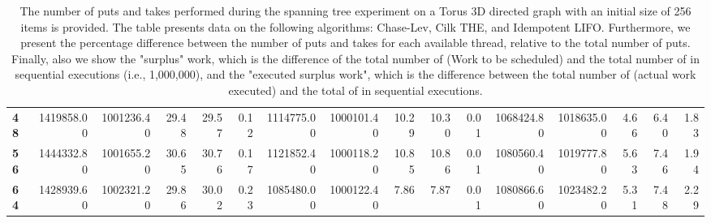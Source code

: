 \begin{table}[!ht]
{\begin{tabular}{lrrrrrrrrrrrrrrr}
\textbf{48} & 1419858.00 & 1001236.40 &          29.48 &       29.57 &                 0.12 & 1114775.00 & 1000101.40 &          10.29 &       10.30 &                 0.01 &      1068424.80 & 1018635.00 &           4.66 &        6.40 &                 1.83 \\
\textbf{56} & 1444332.80 & 1001655.20 &          30.65 &       30.76 &                 0.17 & 1121852.40 & 1000118.20 &          10.85 &       10.86 &                 0.01 &      1080560.40 & 1019777.80 &           5.63 &        7.46 &                 1.94 \\
\textbf{64} & 1428939.60 & 1002321.20 &          29.86 &       30.02 &                 0.23 & 1085480.00 & 1000122.40 &           7.86 &        7.87 &                 0.01 &      1080866.60 & 1023482.20 &           5.31 &        7.48 &                 2.29 \\
\bottomrule
\end{tabular}}
\label{difference-Torus_3D_directed-256-CHASELEV-CILK-IDEMPOTENT_LIFO}
\caption{The number of puts and takes performed during the
    spanning tree experiment on a Torus 3D directed graph with an initial size
    of 256 items is provided. The table presents data on the
    following algorithms: Chase-Lev, Cilk THE, and
    Idempotent LIFO. Furthermore, we present the percentage difference
    between the number of puts and takes for each available thread,
    relative to the total number of puts. Finally, also we show the
    "surplus" work, which is the difference of the total number of
    \Puts (Work to be scheduled) and the total number of \Puts in
    sequential executions (i.e., 1,000,000), and the "executed surplus
    work", which is the difference between the total number of \Takes
    (actual work executed) and the total of \Takes in sequential
    executions.}
\end{table}
